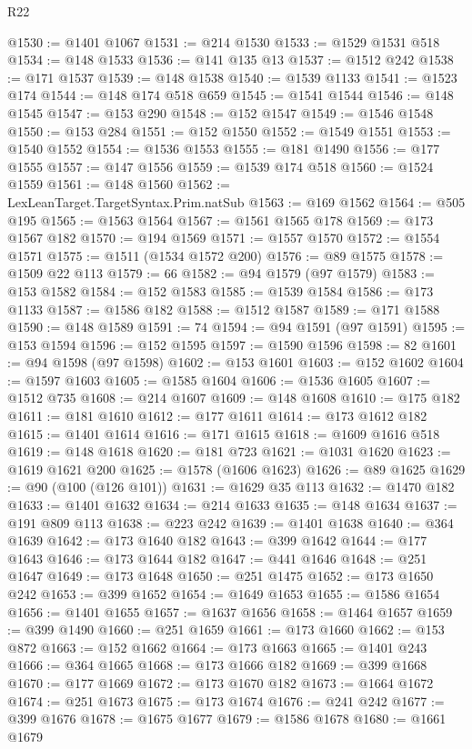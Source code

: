 \begin{lexlean}{R22}
\begin{coremodule}
@1530 := @1401 @1067
@1531 := @214 @1530
@1533 := @1529 @1531 @518
@1534 := @148 @1533
@1536 := @141 @135 @13
@1537 := @1512 @242
@1538 := @171 @1537
@1539 := @148 @1538
@1540 := @1539 @1133
@1541 := @1523 @174
@1544 := @148 @174 @518 @659
@1545 := @1541 @1544
@1546 := @148 @1545
@1547 := @153 @290
@1548 := @152 @1547
@1549 := @1546 @1548
@1550 := @153 @284
@1551 := @152 @1550
@1552 := @1549 @1551
@1553 := @1540 @1552
@1554 := @1536 @1553
@1555 := @181 @1490
@1556 := @177 @1555
@1557 := @147 @1556
@1559 := @1539 @174 @518
@1560 := @1524 @1559
@1561 := @148 @1560
@1562 := LexLeanTarget.TargetSyntax.Prim.natSub
@1563 := @169 @1562
@1564 := @505 @195
@1565 := @1563 @1564
@1567 := @1561 @1565 @178
@1569 := @173 @1567 @182
@1570 := @194 @1569
@1571 := @1557 @1570
@1572 := @1554 @1571
@1575 := @1511 (@1534 @1572 @200)
@1576 := @89 @1575
@1578 := @1509 @22 @113
@1579 := 66
@1582 := @94 @1579 (@97 @1579)
@1583 := @153 @1582
@1584 := @152 @1583
@1585 := @1539 @1584
@1586 := @173 @1133
@1587 := @1586 @182
@1588 := @1512 @1587
@1589 := @171 @1588
@1590 := @148 @1589
@1591 := 74
@1594 := @94 @1591 (@97 @1591)
@1595 := @153 @1594
@1596 := @152 @1595
@1597 := @1590 @1596
@1598 := 82
@1601 := @94 @1598 (@97 @1598)
@1602 := @153 @1601
@1603 := @152 @1602
@1604 := @1597 @1603
@1605 := @1585 @1604
@1606 := @1536 @1605
@1607 := @1512 @735
@1608 := @214 @1607
@1609 := @148 @1608
@1610 := @175 @182
@1611 := @181 @1610
@1612 := @177 @1611
@1614 := @173 @1612 @182
@1615 := @1401 @1614
@1616 := @171 @1615
@1618 := @1609 @1616 @518
@1619 := @148 @1618
@1620 := @181 @723
@1621 := @1031 @1620
@1623 := @1619 @1621 @200
@1625 := @1578 (@1606 @1623)
@1626 := @89 @1625
@1629 := @90 (@100 (@126 @101))
@1631 := @1629 @35 @113
@1632 := @1470 @182
@1633 := @1401 @1632
@1634 := @214 @1633
@1635 := @148 @1634
@1637 := @191 @809 @113
@1638 := @223 @242
@1639 := @1401 @1638
@1640 := @364 @1639
@1642 := @173 @1640 @182
@1643 := @399 @1642
@1644 := @177 @1643
@1646 := @173 @1644 @182
@1647 := @441 @1646
@1648 := @251 @1647
@1649 := @173 @1648
@1650 := @251 @1475
@1652 := @173 @1650 @242
@1653 := @399 @1652
@1654 := @1649 @1653
@1655 := @1586 @1654
@1656 := @1401 @1655
@1657 := @1637 @1656
@1658 := @1464 @1657
@1659 := @399 @1490
@1660 := @251 @1659
@1661 := @173 @1660
@1662 := @153 @872
@1663 := @152 @1662
@1664 := @173 @1663
@1665 := @1401 @243
@1666 := @364 @1665
@1668 := @173 @1666 @182
@1669 := @399 @1668
@1670 := @177 @1669
@1672 := @173 @1670 @182
@1673 := @1664 @1672
@1674 := @251 @1673
@1675 := @173 @1674
@1676 := @241 @242
@1677 := @399 @1676
@1678 := @1675 @1677
@1679 := @1586 @1678
@1680 := @1661 @1679

\end{coremodule}
\end{lexlean}
